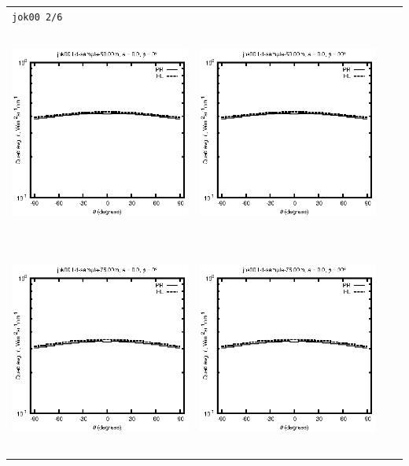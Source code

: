 \documentclass[10pt,a4paper]{article}
\begin{document}
\begin{adjustwidth}{-1.2in}{-1.2in}
\begin{tabular}{c c c c}
\multicolumn{4}{l}{\texttt{jok00 2/6}} \\
\includegraphics[height=7cm]{../eps/jok00_Ld_sample_50.00m_fwd.eps} &
\includegraphics[height=7cm]{../eps/jok00_Ld_sample_50.00m_cross.eps} \\
\includegraphics[height=7cm]{../eps/jok00_Ld_sample_75.00m_fwd.eps} &
\includegraphics[height=7cm]{../eps/jok00_Ld_sample_75.00m_cross.eps} \\

\end{tabular}
\end{adjustwidth}
\end{document}
